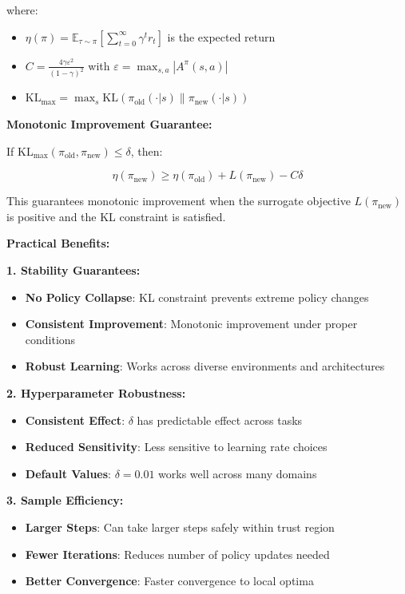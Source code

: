 \documentclass[12pt]{article}
\begin{document}
{{where:
\begin{itemize}
\item $\eta(\pi) = \mathbb{E}_{\tau \sim \pi}[\sum_{t=0}^\infty \gamma^t r_t]$ is the expected return
\item $C = \frac{4\gamma\varepsilon^2}{(1-\gamma)^2}$ with $\varepsilon = \max_{s,a} |A^\pi(s,a)|$
\item $\text{KL}_{\max} = \max_s \text{KL}(\pi_{\text{old}}(\cdot|s) \| \pi_{\text{new}}(\cdot|s))$
\end{itemize}

\textbf{Monotonic Improvement Guarantee:}

If $\text{KL}_{\max}(\pi_{\text{old}}, \pi_{\text{new}}) \leq \delta$, then:

\begin{equation}
\eta(\pi_{\text{new}}) \geq \eta(\pi_{\text{old}}) + L(\pi_{\text{new}}) - C\delta
\end{equation}

This guarantees monotonic improvement when the surrogate objective $L(\pi_{\text{new}})$ is positive and the KL constraint is satisfied.

\textbf{Practical Benefits:}

\textbf{1. Stability Guarantees:}
\begin{itemize}
\item \textbf{No Policy Collapse}: KL constraint prevents extreme policy changes
\item \textbf{Consistent Improvement}: Monotonic improvement under proper conditions
\item \textbf{Robust Learning}: Works across diverse environments and architectures
\end{itemize}

\textbf{2. Hyperparameter Robustness:}
\begin{itemize}
\item \textbf{Consistent Effect}: $\delta$ has predictable effect across tasks
\item \textbf{Reduced Sensitivity}: Less sensitive to learning rate choices
\item \textbf{Default Values}: $\delta = 0.01$ works well across many domains
\end{itemize}

\textbf{3. Sample Efficiency:}
\begin{itemize}
\item \textbf{Larger Steps}: Can take larger steps safely within trust region
\item \textbf{Fewer Iterations}: Reduces number of policy updates needed
\item \textbf{Better Convergence}: Faster convergence to local optima
\end{itemize}

}}
\end{document}
